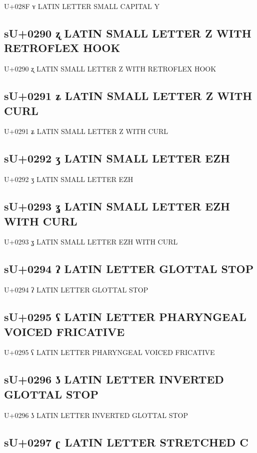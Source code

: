 U+028F ʏ LATIN LETTER SMALL CAPITAL Y

\subsection{sU+0290 ʐ LATIN SMALL LETTER Z WITH RETROFLEX HOOK}

U+0290 ʐ LATIN SMALL LETTER Z WITH RETROFLEX HOOK

\subsection{sU+0291 ʑ LATIN SMALL LETTER Z WITH CURL}

U+0291 ʑ LATIN SMALL LETTER Z WITH CURL

\subsection{sU+0292 ʒ LATIN SMALL LETTER EZH}

U+0292 ʒ LATIN SMALL LETTER EZH

\subsection{sU+0293 ʓ LATIN SMALL LETTER EZH WITH CURL}

U+0293 ʓ LATIN SMALL LETTER EZH WITH CURL

\subsection{sU+0294 ʔ LATIN LETTER GLOTTAL STOP}

U+0294 ʔ LATIN LETTER GLOTTAL STOP

\subsection{sU+0295 ʕ LATIN LETTER PHARYNGEAL VOICED FRICATIVE}

U+0295 ʕ LATIN LETTER PHARYNGEAL VOICED FRICATIVE

\subsection{sU+0296 ʖ LATIN LETTER INVERTED GLOTTAL STOP}

U+0296 ʖ LATIN LETTER INVERTED GLOTTAL STOP

\subsection{sU+0297 ʗ LATIN LETTER STRETCHED C}

